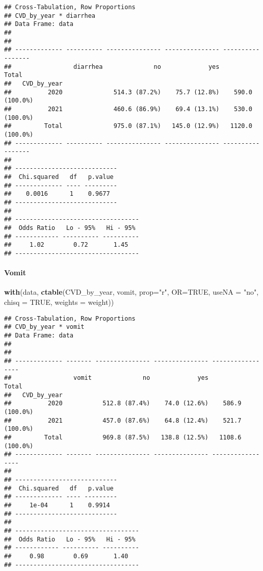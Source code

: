 \documentclass[
]{article}
\newenvironment{Shaded}{\begin{snugshade}}{\end{snugshade}}
\newcommand{\AttributeTok}[1]{\textcolor[rgb]{0.13,0.29,0.53}{#1}}
\newcommand{\ConstantTok}[1]{\textcolor[rgb]{0.56,0.35,0.01}{#1}}
\newcommand{\FunctionTok}[1]{\textcolor[rgb]{0.13,0.29,0.53}{\textbf{#1}}}
\newcommand{\NormalTok}[1]{#1}
\newcommand{\StringTok}[1]{\textcolor[rgb]{0.31,0.60,0.02}{#1}}
\begin{document}
\begin{verbatim}
## Cross-Tabulation, Row Proportions  
## CVD_by_year * diarrhea  
## Data Frame: data  
## 
## 
## ------------- ---------- --------------- --------------- -----------------
##                 diarrhea              no             yes             Total
##   CVD_by_year                                                             
##          2020              514.3 (87.2%)    75.7 (12.8%)    590.0 (100.0%)
##          2021              460.6 (86.9%)    69.4 (13.1%)    530.0 (100.0%)
##         Total              975.0 (87.1%)   145.0 (12.9%)   1120.0 (100.0%)
## ------------- ---------- --------------- --------------- -----------------
## 
## ----------------------------
##  Chi.squared   df   p.value 
## ------------- ---- ---------
##    0.0016      1    0.9677  
## ----------------------------
## 
## ----------------------------------
##  Odds Ratio   Lo - 95%   Hi - 95% 
## ------------ ---------- ----------
##     1.02        0.72       1.45   
## ----------------------------------
\end{verbatim}

\hypertarget{vomit-1}{%
\paragraph{\texorpdfstring{{ Vomit }}{ Vomit }}\label{vomit-1}}

\begin{Shaded}
\begin{Highlighting}[]
\FunctionTok{with}\NormalTok{(data, }\FunctionTok{ctable}\NormalTok{(CVD\_by\_year, vomit, }\AttributeTok{prop=}\StringTok{"r"}\NormalTok{, }\AttributeTok{OR=}\ConstantTok{TRUE}\NormalTok{, }\AttributeTok{useNA =} \StringTok{"no"}\NormalTok{, }\AttributeTok{chisq =} \ConstantTok{TRUE}\NormalTok{, }\AttributeTok{weights =}\NormalTok{ weight))}
\end{Highlighting}
\end{Shaded}

\begin{verbatim}
## Cross-Tabulation, Row Proportions  
## CVD_by_year * vomit  
## Data Frame: data  
## 
## 
## ------------- ------- --------------- --------------- -----------------
##                 vomit              no             yes             Total
##   CVD_by_year                                                          
##          2020           512.8 (87.4%)    74.0 (12.6%)    586.9 (100.0%)
##          2021           457.0 (87.6%)    64.8 (12.4%)    521.7 (100.0%)
##         Total           969.8 (87.5%)   138.8 (12.5%)   1108.6 (100.0%)
## ------------- ------- --------------- --------------- -----------------
## 
## ----------------------------
##  Chi.squared   df   p.value 
## ------------- ---- ---------
##     1e-04      1    0.9914  
## ----------------------------
## 
## ----------------------------------
##  Odds Ratio   Lo - 95%   Hi - 95% 
## ------------ ---------- ----------
##     0.98        0.69       1.40   
## ----------------------------------
\end{verbatim}
\end{document}
